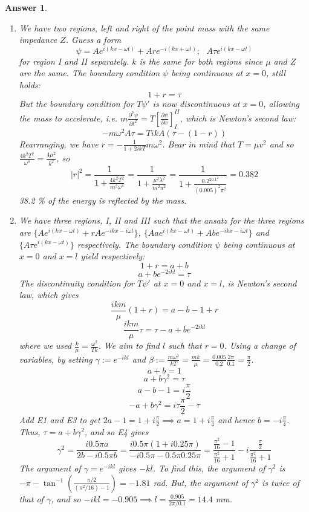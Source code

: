 \documentclass[a4paper]{article}
\newtheorem{ans}{Answer}[section]
\theoremstyle{new}
\begin{document}
\begin{ans}\leavevmode
\begin{enumerate}[label=(\alph*)]
\item We have two regions, left and right of the point mass with the same impedance $Z$. Guess a form
$$\psi=Ae^{i(kx-\omega t)}+Are^{-i(kx+\omega t)};\text{  }A\tau e^{i(kx-\omega t)}$$
for region I and II separately. $k$ is the same for both regions since $\mu$ and $Z$ are the same. The boundary condition $\psi$ being continuous at $x=0$, still holds:
$$1+r=\tau$$
But the boundary condition for $T\psi'$ is now discontinuous at $x=0$, allowing the mass to accelerate, i.e. $m\frac{\partial^2\psi}{\partial t^2}=T[\frac{\partial\psi}{\partial x}]_I^{II}$, which is Newton's second law:
$$-m\omega^2A\tau=TikA(\tau-(1-r))$$
Rearranging, we have $r=-\frac{1}{1+2ikT}{m\omega^2}$. Bear in mind that $T=\mu v^2$ and so $\frac{4k^2T^2}{\omega^4}=\frac{4\mu^2}{k^2}$, so
$$|r|^2=\frac{1}{1+\frac{4k^2T^2}{m^2\omega^4}}=\frac{1}{1+\frac{\mu^2\lambda^2}{m^2\pi^2}}=\frac{1}{1+\frac{0.2^20.1^2}{(0.005)^2\pi^2}}=0.382$$
38.2 \% of the energy is reflected by the mass.
\item We have three regions, I, II and III such that the ansatz for the three regions are $\{Ae^{i(kx-\omega t)}+rAe^{-ikx-i\omega t}\}$, $\{Aae^{i(kx-\omega t)}+Abe^{-ikx-i\omega t}\}$ and $\{A\tau e^{i(kx-\omega t)}\}$ respectively. The boundary condition $\psi$ being continuous at $x=0$ and $x=l$ yield respectively:
$$1+r=a+b$$
$$a+be^{-2ikl}=\tau$$
The discontinuity condition for $T\psi'$ at $x=0$ and $x=l$, is Newton's second law, which gives
$$\frac{ikm}{\mu}(1+r)=a-b-1+r$$
$$\frac{ikm}{\mu}\tau=\tau-a+be^{-2ikl}$$
where we used $\frac{k}{\mu}=\frac{\omega^2}{Tk}$. We aim to find $l$ such that $r=0$. Using a change of variables, by setting $\gamma:=e^{-ikl}$ and $\beta:=\frac{m\omega^2}{kT}=\frac{mk}{\mu}=\frac{0.005}{0.2}\frac{2\pi}{0.1}=\frac{\pi}{2}$. 
\begin{equation}
    a+b=1\tag{E1}
\end{equation}
\begin{equation}
    a+b\gamma^2=\tau\tag{E2}
\end{equation}
\begin{equation}
    a-b-1=i\frac{\pi}{2}\tag{E3}
\end{equation}
\begin{equation}
    -a+b\gamma^2=i\tau\frac{\pi}{2}-\tau\tag{E4}
\end{equation}
Add E1 and E3 to get $2a-1=1+i\frac{\pi}{2}\implies a=1+i\frac{\pi}{4}$ and hence $b=-i\frac{\pi}{4}$. Thus, $\tau=a+b\gamma^2$, and so E4 gives
$$\gamma^2=\frac{i0.5\pi a}{2b-i0.5\pi b}=\frac{i0.5\pi(1+i0.25\pi)}{-i0.5\pi-0.5\pi0.25\pi}=\frac{\frac{\pi^2}{16}-1}{\frac{\pi^2}{16}+1}-i\frac{\frac{\pi}{2}}{\frac{\pi^2}{16}+1}$$
The argument of $\gamma=e^{-ikl}$ gives $-kl$. To find this, the argument of $\gamma^2$ is $-\pi-\tan^{-1}(\frac{\pi/2}{(\pi^2/16)-1})=-1.81$ rad. But, the argument of $\gamma^2$ is twice of that of $\gamma$, and so $-ikl=-0.905\implies l=\frac{0.905}{2\pi/0.1}=14.4$ mm.
\end{enumerate}
\end{ans}
\end{document}
